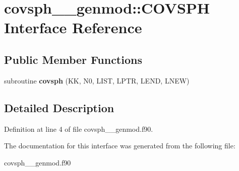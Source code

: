 \hypertarget{interfacecovsph____genmod_1_1_c_o_v_s_p_h}{\section{covsph\+\_\+\+\_\+genmod\+:\+:C\+O\+V\+S\+P\+H Interface Reference}
\label{interfacecovsph____genmod_1_1_c_o_v_s_p_h}
}
\subsection*{Public Member Functions}
\begin{DoxyCompactItemize}
\item 
\hypertarget{interfacecovsph____genmod_1_1_c_o_v_s_p_h_a1bb4d24e7c385411a954116842a8e6b4}{subroutine {\bfseries covsph} (K\+K, N0, L\+I\+S\+T, L\+P\+T\+R, L\+E\+N\+D, L\+N\+E\+W)}\label{interfacecovsph____genmod_1_1_c_o_v_s_p_h_a1bb4d24e7c385411a954116842a8e6b4}

\end{DoxyCompactItemize}


\subsection{Detailed Description}


Definition at line 4 of file covsph\+\_\+\+\_\+genmod.\+f90.



The documentation for this interface was generated from the following file\+:\begin{DoxyCompactItemize}
\item 
covsph\+\_\+\+\_\+genmod.\+f90\end{DoxyCompactItemize}
